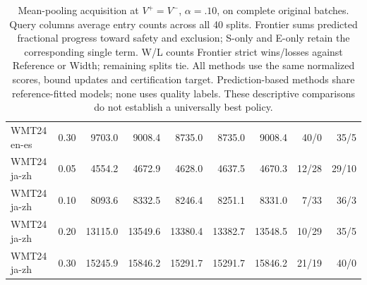 \begin{table}[t]
\begin{tabular}{lrrrrrrrr}
WMT24 en-es & 0.30 & 9703.0 & 9008.4 & 8735.0 & 8735.0 & 9008.4 & 40/0 & 35/5 \\
WMT24 ja-zh & 0.05 & 4554.2 & 4672.9 & 4628.0 & 4637.5 & 4670.3 & 12/28 & 29/10 \\
WMT24 ja-zh & 0.10 & 8093.6 & 8332.5 & 8246.4 & 8251.1 & 8331.0 & 7/33 & 36/3 \\
WMT24 ja-zh & 0.20 & 13115.0 & 13549.6 & 13380.4 & 13382.7 & 13548.5 & 10/29 & 35/5 \\
WMT24 ja-zh & 0.30 & 15245.9 & 15846.2 & 15291.7 & 15291.7 & 15846.2 & 21/19 & 40/0 \\
\bottomrule
\end{tabular}
\caption{Mean-pooling acquisition at $V^+=V^-$, $\alpha=.10$, on complete original batches. Query columns average entry counts across all 40 splits. Frontier sums predicted fractional progress toward safety and exclusion; S-only and E-only retain the corresponding single term. W/L counts Frontier strict wins/losses against Reference or Width; remaining splits tie. All methods use the same normalized scores, bound updates and certification target. Prediction-based methods share reference-fitted models; none uses quality labels. These descriptive comparisons do not establish a universally best policy.}
\label{tab:frontier-exact}
\end{table}

